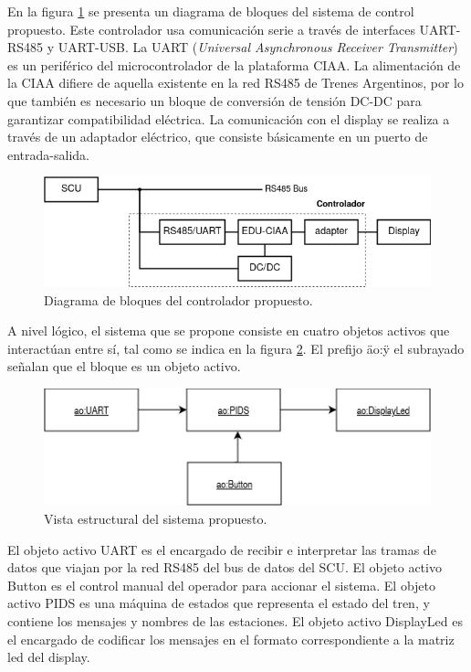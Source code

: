 En la figura \ref{fig:diagVistaReDisenhoEduCIAA} se presenta un diagrama de bloques del sistema de control propuesto. Este controlador usa comunicación serie a través de interfaces UART-RS485 y UART-USB. La UART (\textit{Universal Asynchronous Receiver Transmitter}) es un periférico del microcontrolador de la plataforma CIAA. La alimentación de la CIAA difiere de aquella existente en la red RS485 de Trenes Argentinos, por lo que también es necesario un bloque de conversión de tensión DC-DC para garantizar compatibilidad eléctrica. La comunicación con el display se realiza a través de un adaptador eléctrico, que consiste básicamente en un puerto de entrada-salida.\\


\begin{figure}[ht]
	\centering
	\includegraphics[width=1\textwidth]{./Figures/diagVistaReDisenhoEduCIAA.png}
	\caption{Diagrama de bloques del controlador propuesto.}
	\label{fig:diagVistaReDisenhoEduCIAA}
\end{figure}

A nivel lógico, el sistema que se propone consiste en cuatro objetos activos que interactúan entre sí, tal como se indica en la figura \ref{fig:diagVistaDisenho}. El prefijo \"ao:\" y el subrayado señalan que el bloque es un objeto activo.\\


\begin{figure}[ht]
	\centering
	\includegraphics[width=1\textwidth]{./Figures/diagVistaDisenho.png}
	\caption{Vista estructural del sistema propuesto.}
	\label{fig:diagVistaDisenho}
\end{figure}

El objeto activo UART es el encargado de recibir e interpretar las tramas de datos que viajan por la red RS485 del bus de datos del SCU. El objeto activo Button es el control manual del operador para accionar el sistema. El objeto activo PIDS es una máquina de estados que representa el estado del tren, y contiene los mensajes y nombres de las estaciones. El objeto activo DisplayLed es el encargado de codificar los mensajes en el formato correspondiente a la matriz led del display.\\

